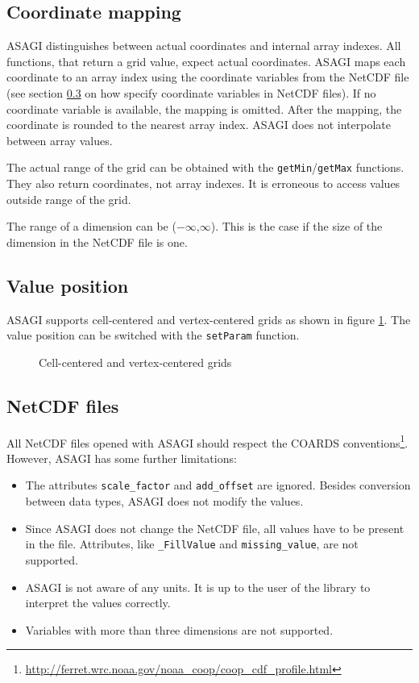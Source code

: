 \subsection{Coordinate mapping}

ASAGI distinguishes between actual coordinates and internal array indexes. All functions, that return a grid value, expect actual coordinates. ASAGI maps each coordinate to an array index using the coordinate variables from the NetCDF file (see section \ref{sec:netcdf files} on how specify coordinate variables in NetCDF files). If no coordinate variable is available, the mapping is omitted. After the mapping, the coordinate is rounded to the nearest array index. ASAGI does not interpolate between array values.

The actual range of the grid can be obtained with the \texttt{getMin}/\texttt{getMax} functions. They also return coordinates, not array indexes. It is erroneous to access values outside range of the grid.

The range of a dimension can be ($-\infty$,$\infty$). This is the case if the size of the dimension in the NetCDF file is one.

\subsection{Value position}

ASAGI supports cell-centered and vertex-centered grids as shown in figure \ref{fig:cell-centered vertex-centered}. The value position can be switched with the \texttt{setParam} function.

\begin{figure}[h]
 \def\xwidth{7}
 \def\ywidth{5}
 \def\scale{0.7}
 \centering
  \qquad
 \caption{Cell-centered and vertex-centered grids}
 \label{fig:cell-centered vertex-centered}
\end{figure}


\subsection{NetCDF files}
\label{sec:netcdf files}

All NetCDF files opened with ASAGI should respect the COARDS conventions\footnote{\url{http://ferret.wrc.noaa.gov/noaa_coop/coop_cdf_profile.html}}. However, ASAGI has some further limitations:
\begin{itemize}
 \item The attributes \texttt{scale\_factor} and \texttt{add\_offset} are ignored. Besides conversion between data types, ASAGI does not modify the values.
 \item Since ASAGI does not change the NetCDF file, all values have to be present in the file. Attributes, like \texttt{\_FillValue} and \texttt{missing\_value}, are not supported.
 \item ASAGI is not aware of any units. It is up to the user of the library to interpret the values correctly.
 \item Variables with more than three dimensions are not supported.
\end{itemize}

